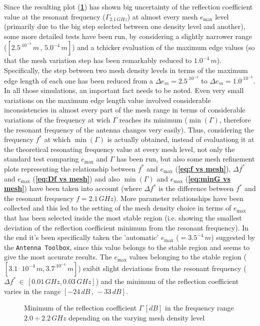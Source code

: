 \documentclass[10pt,a4paper,twocolumn]{article}
\begin{document}
{Since the resulting plot  (\textbf{\cref{fig:first mesh test}}) has shown big uncertainty of the reflection coefficient value at the resonant frequency ($\Gamma_{2.1\,GHz}$) at almost every mesh $e_{\max}$ level (primarily due to the big step selected between one density level and another), some more detailed tests have been run, by considering a slightly narrower range ($[2.5^.10^{-4}\,m\,,\,5.0^{-4}\,m]$) and a tchicker evaluation of the maximum edge values (so that the mesh variation step has been remarkably reduced to $1.0^{-4}\,m$). Specifically, the step between two mesh density levels in terms of the maximum edge length of each one has been reduced from a $\Delta e_m=2.5^.10^{-4}$ to $\Delta e_m=1.0^.10^{-4}$. In all those simulations, an important fact needs to be noted. Even very small variations on the maximum edge length value involved considerable inconsistencies in almost every part of the mesh range in terms of considerable variations of the frequency at wich $\Gamma$ reaches its minimum ($\min(\Gamma)$, therefore the resonant frequency of the antenna changes very easily).  
Thus, considering the frequency $f^*$ at which $\min(\Gamma)$ is actually obtained, instead of evaluationg it at the theoretical resonating frequency value at every mesh level, not only the standard test comparing $e_{\max}$ and $\Gamma$ has been run, but also some mesh refinement plots representing the relationship between $f^*$ and $e_{\max}$ (\textbf{\cref{eq:f vs mesh}}), $\Delta f^*$ and $e_{\max}$ (\textbf{\cref{eq:Df vs mesh}}) and also $\min(\Gamma)$ and $e_{\max}$ (\textbf{\cref{eq:minG vs mesh}}) have been taken into account (where $\Delta f^*$ is the difference between $f^*$ and the resonant frequency $f=2.1\,GHz$). More parameter relationships have been collected and this led to the setting of the mesh density choice in terms of $e_{\max}$ that has been selected inside the most stable region (i.e. showing the smallest deviation of the reflection coefficient minimum from the resonant frequency). In the end it's been specifically taken the 'automatic' $e_{\max}$ ($=3.5^{-4}\,m$) suggested by the \texttt{\color{Mahogany}Antenna Toolbox}, since this value  belongs to the stable region and seems to give the most accurate results. The $e_{\max}$ values belonging to the stable region ($[3.1\,^.\,10^{-4}\,m,3.7^.10^{-4}\,m]$) exibit slight deviations from the resonant frequency ($\Delta f^*\,\in\,[0.01\,GHz,0.03\,GHz]$) and the minimum of the reflection coefficient varies in the range $[-24\,dB\,,\,-33\,dB]$. 
\begin{figure}[bt!]
	\def\svgwidth{\linewidth}
	\tiny{}
	\hfill
	\caption{{Minimum of the reflection coefficient $\Gamma\, [dB]$ in the frequency range $2.0\div 2.2\,GHz$ depending on the varying mesh density level}}
	\label{fig:first mesh test}
\end{figure}

}
\end{document}
